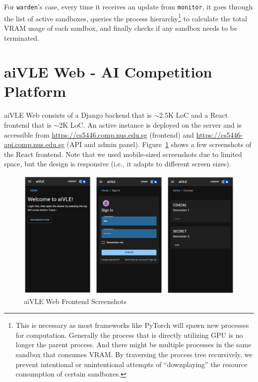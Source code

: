 For \texttt{warden}'s case, every time it receives an update from \texttt{monitor}, it goes through the list of active sandboxes, queries the process hierarchy\footnote{This is necessary as most frameworks like PyTorch will spawn new processes for computation. Generally the process that is directly utilizing GPU is no longer the parent process. And there might be multiple processes in the same sandbox that consumes VRAM. By traversing the process tree recursively, we prevent intentional or unintentional attempts of ``downplaying'' the resource consumption of certain sandboxes.} to calculate the total VRAM usage of each sandbox, and finally checks if any sandbox needs to be terminated.

\section{aiVLE Web - AI Competition Platform}
\label{ch:aivle-web}
aiVLE Web consists of a Django backend that is $\sim$2.5K LoC and a React frontend that is $\sim$2K LoC. An active instance is deployed on the server and is accessible from \href{https://cs5446.comp.nus.edu.sg}{https://cs5446.comp.nus.edu.sg} (frontend) and \href{https://cs5446-api.comp.nus.edu.sg}{https://cs5446-api.comp.nus.edu.sg} (API and admin panel). Figure~\ref{fig:aivle-web-frontend-screenshot} shows a few screenshots of the React frontend. Note that we used mobile-sized screenshots due to limited space, but the design is responsive (i.e., it adapts to different screen sizes).

\begin{figure}[H]
    \centering
    \includegraphics[width=\textwidth]{images/aivle-web-frontend-screenshot.png}
    \caption{aiVLE Web Frontend Screenshots}
    \label{fig:aivle-web-frontend-screenshot}
\end{figure}


